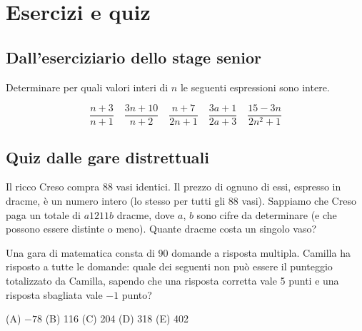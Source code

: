 \chapter{Esercizi e quiz}
\label{ch:quiz}

\section{Dall'eserciziario dello stage senior}
\label{sec:quiz_stage_senior}

\begin{esercizio}
    \label{ex:stage_senior_41}
    Determinare per quali valori interi di $n$ le seguenti espressioni sono intere.

    \begin{equation*}
        \dfrac{n + 3}{n + 1} \quad \dfrac{3n + 10}{n + 2} \quad \dfrac{n + 7}{2n + 1} \quad \dfrac{3a + 1}{2a + 3} \quad
        \dfrac{15 - 3n}{2n^2 + 1}
    \end{equation*}
\end{esercizio}

\section{Quiz dalle gare distrettuali}
\label{sec:quiz_gare_distrettuali}

\begin{esercizio}
    \label{ex:distrettuali_2017_13}
    Il ricco Creso compra 88 vasi identici.
    Il prezzo di ognuno di essi, espresso in dracme, è un numero intero (lo stesso per tutti gli 88 vasi).
    Sappiamo che Creso paga un totale di $a1211b$ dracme, dove $a$, $b$ sono cifre da determinare
    (e che possono essere distinte o meno).
    Quante dracme costa un singolo vaso?
\end{esercizio}

\begin{esercizio}
    \label{ex:distrettuali_2018_1}
    Una gara di matematica consta di 90 domande a risposta multipla.
    Camilla ha risposto a tutte le domande: quale dei seguenti non può essere il punteggio totalizzato da Camilla,
    sapendo che una risposta corretta vale 5 punti e una risposta sbagliata vale $-1$ punto?

    (A) $-78$ \quad (B) 116 \quad (C) 204 \quad (D) 318 \quad (E) 402
\end{esercizio}

